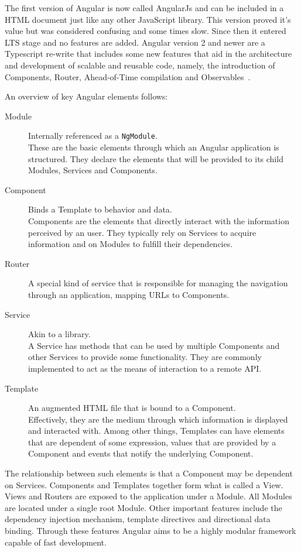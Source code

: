 The first version of Angular is now called AngularJs and can be included in a \gls{HTML} document just like any other JavaScript library. This version proved it's value but was considered confusing and some times slow. Since then it entered \gls{LTS} stage and no features are added. Angular version 2 and newer are a Typescript re-write that includes some new features that aid in the architecture and development of scalable and reusable code, namely, the introduction of Components, Router, Ahead-of-Time compilation and Observables~\cite{angular}.

An overview of key Angular elements follows:

\begin{description}
\item[Module] Internally referenced as a \texttt{NgModule}. \\
  These are the basic elements through which an Angular application is structured\cite{angularmodule}. They declare the elements that will be provided to its child Modules, Services and Components.
\item[Component] Binds a Template to behavior and data.\\ Components are the elements that directly interact with the information perceived by an user. They typically rely on Services to acquire information and on Modules to fulfill their dependencies. 
\item[Router] A special kind of service that is responsible for managing the navigation through an application, mapping \gls{URL}s to Components.
\item[Service] Akin to a library.\\ A Service has methods that can be used by multiple Components and other Services to provide some functionality. They are commonly implemented to act as the means of interaction to a remote \gls{API}.
\item[Template] An augmented \gls{HTML} file that is bound to a Component.\\
  Effectively, they are the medium through which information is displayed and interacted with. Among other things, Templates can have elements that are dependent of some expression, values that are provided by a Component and events that notify the underlying Component.
\end{description}

The relationship between such elements is that a Component may be dependent on Services. Components and Templates together form what is called a View. Views and Routers are exposed to the application under a Module. All Modules are located under a single root Module.
Other important features include the dependency injection mechanism, template directives and directional data binding. Through these features Angular aims to be a highly modular framework capable of fast development.

